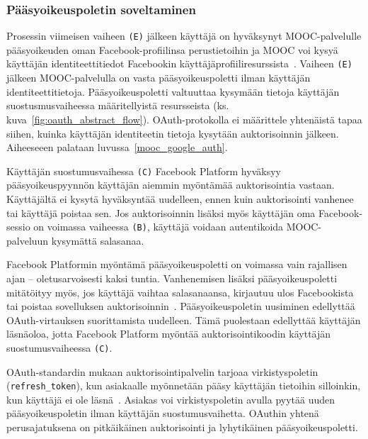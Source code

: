 \documentclass[finnish,gradu]{tktltiki}
\begin{document}

  \subsubsection{Pääsyoikeuspoletin soveltaminen} %
  \label{ssub:ensimmäisen_auktorisoinnin_jälkeen}

  Prosessin viimeisen vaiheen \verb!(E)! jälkeen käyttäjä on hyväksynyt MOOC-palvelulle pääsyoikeuden oman Facebook-profiilinsa perustietoihin ja MOOC voi kysyä käyttäjän identiteettitiedot Facebookin käyttäjäprofiiliresurssista~\cite{facebook_graph_api_user}. Vaiheen \verb!(E)! jälkeen MOOC-palvelulla on vasta pääsyoikeuspoletti ilman käyttäjän identiteettitietoja. Pääsyoikeuspoletti valtuuttaa kysymään tietoja käyttäjän suostusmusvaiheessa määritellyistä resursseista (ks. kuva~\ref{fig:oauth_abstract_flow}). OAuth-protokolla ei määrittele yhtenäistä tapaa siihen, kuinka käyttäjän identiteetin tietoja kysytään auktorisoinnin jälkeen. Aiheeseeen palataan luvussa~\ref{mooc_google_auth}.

   Käyttäjän suostumusvaihessa \verb!(C)! Facebook Platform hyväksyy pääsyoikeuspyynnön käyttäjän aiemmin myöntämää auktorisointia vastaan. Käyttäjältä ei kysytä hyväksyntää uudelleen, ennen kuin auktorisointi vanhenee tai käyttäjä poistaa sen. Jos auktorisoinnin lisäksi myös käyttäjän oma Facebook-sessio on voimassa vaiheessa \verb!(B)!, käyttäjä voidaan autentikoida MOOC-palveluun kysymättä salasanaa.

  Facebook Platformin myöntämä pääsyoikeuspoletti on voimassa vain rajallisen ajan -- oletusarvoisesti kaksi tuntia. Vanhenemisen lisäksi pääsyoikeuspoletti mitätöityy myös, jos käyttäjä vaihtaa salasanaansa, kirjautuu ulos Facebookista tai poistaa sovelluksen auktorisoinnin~\cite{facebook_oauth2_expired_tokens}. Pääsyoikeuspoletin uusiminen edellyttää OAuth-virtauksen suorittamista uudelleen. Tämä puolestaan edellyttää käyttäjän läsnäoloa, jotta Facebook Platform myöntää auktorisointikoodin käyttäjän suostumusvaiheessa \verb!(C)!.

  OAuth-standardin mukaan auktorisointipalvelin tarjoaa virkistyspoletin (\verb!refresh_token!), kun asiakaalle myönnetään pääsy käyttäjän tietoihin silloinkin, kun käyttäjä ei ole läsnä~\cite{ietf_oauth2}. Asiakas voi virkistyspoletin avulla pyytää uuden pääsyoikeuspoletin ilman käyttäjän suostumusvaihetta. OAuthin yhtenä perusajatuksena on pitkäikäinen auktorisointi ja lyhytikäinen pääsyoikeuspoletti.
\end{document}
